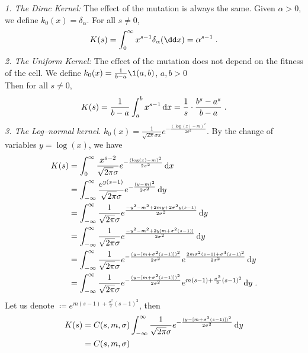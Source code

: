 \textit{1. The Dirac Kernel:} The effect of the mutation is always the same. Given $\alpha > 0$, we define $k_0(x) = \delta_\alpha$. For all $s \neq 0$,
\begin{align*}
    K(s) = \int_0^\infty x^{s-1} \delta_\alpha(\dd x) = \alpha^{s-1}
    \eqfinp
\end{align*}
\textit{2. The Uniform Kernel:} The effect of the mutation does not depend on the fitness of the cell. We define $k_0(x) = \frac{1}{b-a}\1{(a,b)}$, $a,b > 0$ \\
Then for all $s \neq 0$, 
    \begin{align*}
        K(s) = \frac{1}{b-a}\int_a^b x^{s-1}\,\mathrm{d} x = \frac1s \cdot\frac{b^s - a^s}{b-a}
        \; .
    \end{align*}
\textit{3. The Log--normal kernel.} $k_0(x) = \frac{1}{\sqrt{2\pi}\sigma x} e^{-\frac{(\log(x)-m)^2}{2\sigma^2}}$.
By the change of variables $y = \log(x)$, we have
    \begin{align*}
        K(s) 
        &= \int_0^\infty \frac{x^{s-2}}{\sqrt{2\pi}\sigma} e^{-\frac{(\log(x)-m)^2}{2\sigma^2}} \,\mathrm{d} x \\
        &= \int_{-\infty}^\infty \frac{e^{y(s-1)}}{\sqrt{2\pi}\sigma} e^{-\frac{(y-m)^2}{2\sigma^2}} \,\mathrm{d} y \\
        &=  \int_{-\infty}^\infty \frac{1}{\sqrt{2\pi}\sigma} e^{\frac{-y^2 - m^2 + 2m y + 2\sigma^2 y(s-1)}{2\sigma^2}} \,\mathrm{d} y \\
        &=  \int_{-\infty}^\infty \frac{1}{\sqrt{2\pi}\sigma} e^{\frac{-y^2 - m^2 + 2y[m + \sigma^2 (s-1)]}{2\sigma^2}} \,\mathrm{d} y \\
        &=  \int_{-\infty}^\infty \frac{1}{\sqrt{2\pi}\sigma} 
        e^{-\frac{(y - [m + \sigma^2 (s-1)])^2}{2\sigma^2}}
        e^{\frac{2m \sigma^2(s-1)+\sigma^4(s-1)^2}{2\sigma^2}}\,\mathrm{d} y \\
        &=  \int_{-\infty}^\infty \frac{1}{\sqrt{2\pi}\sigma} 
        e^{-\frac{(y - [m + \sigma^2 (s-1)])^2}{2\sigma^2}}
        e^{m (s-1)+\frac{\sigma^2}{2}(s-1)^2}\,\mathrm{d} y
        \; .
    \end{align*}
Let us denote $  \coloneqq e^{m (s-1)+\frac{\sigma^2}{2}(s-1)^2}$, then 
\begin{align*}
    K(s) 
    &=  C(s,m,\sigma) \int_{-\infty}^\infty \frac{1}{\sqrt{2\pi}\sigma} 
        e^{-\frac{(y - [m + \sigma^2 (s-1)])^2}{2\sigma^2}}\,\mathrm{d} y
        \\
        &= C(s,m,\sigma)
\end{align*}



